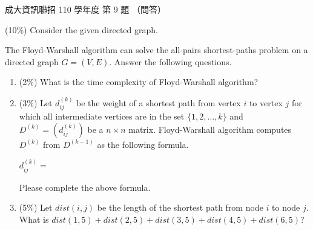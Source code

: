 \begin{pastexam}[label={px:ncku-110-prog-09}]{成大資訊聯招 110 學年度 第 9 題}
（問答）

(10\%) Consider the given directed graph.
\begin{center}
\end{center}
The Floyd-Warshall algorithm can solve the all-pairs shortest-paths problem on a directed graph
$G=(V,E)$. Answer the following questions.
\begin{enumerate}[label=(\arabic*),itemsep=2pt,topsep=2pt]
\item (2\%) What is the time complexity of Floyd-Warshall algorithm?
\item (3\%) Let $d_{ij}^{(k)}$ be the weight of a shortest path from vertex $i$ to vertex $j$ for
which all intermediate vertices are in the set $\{1,2,\ldots,k\}$ and $D^{(k)}=\left(d_{ij}^{(k)}\right)$
be a $n\times n$ matrix. Floyd-Warshall algorithm computes $D^{(k)}$ from $D^{(k-1)}$ as the
following formula.

$d_{ij}^{(k)}=$\underline{\hspace{4cm}}

Please complete the above formula.
\item (5\%) Let $dist(i,j)$ be the length of the shortest path from node $i$ to node $j$. What is
$dist(1,5)+dist(2,5)+dist(3,5)+dist(4,5)+dist(6,5)$?
\end{enumerate}
\end{pastexam}

